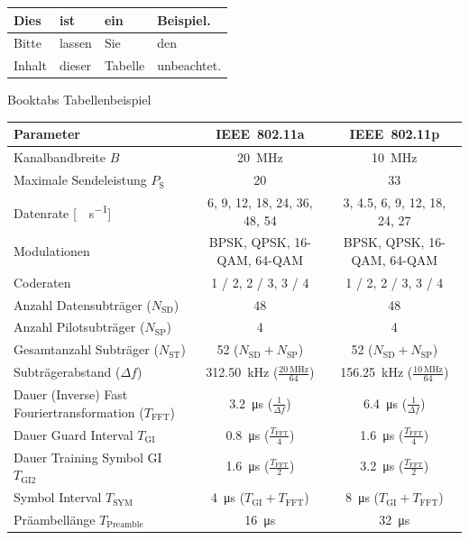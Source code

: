 \begin{table}[htb]
\centering
{}
\label{tbl:beispiel}
\begin{tabular}{l|lll}
Dies & ist & ein & Beispiel.\\\hline
Bitte & lassen & Sie & den \\
Inhalt & dieser & Tabelle & unbeachtet.
\end{tabular}
\end{table}

Booktabs Tabellenbeispiel

\begin{table}[htb]
	\label{tbl:params}
	\footnotesize
	\centering
	\begin{tabular}{m{5cm}*{2}{c}}	%
	\toprule
	\textbf{Parameter} & \textbf{IEEE~802.11a} & \textbf{IEEE~802.11p} \\
	\midrule
	Kanalbandbreite $B$ & \SI{20}{\mega\hertz} & \SI{10}{\mega\hertz} \\
	Maximale Sendeleistung $P_\text{S}$ & \SI{20}{\dBm} & \SI{33}{\dBm} \\
	Datenrate [\si{\mega\bit\per\second}] & 6, 9, 12, 18, 24, 36, 48, 54 & 3, 4.5, 6, 9, 12, 18, 24, 27 \\
	Modulationen & BPSK, QPSK, 16-QAM, 64-QAM & BPSK, QPSK, 16-QAM, 64-QAM \\
	Coderaten & \num{1 / 2}, \num{2 / 3}, \num{3 / 4} & \num{1 / 2}, \num{2 / 3}, \num{3 / 4} \\
	Anzahl Datensubträger ($N_{\text{SD}}$) & 48 & 48 \\
	Anzahl Pilotsubträger ($N_{\text{SP}}$) & 4 & 4 \\
	Gesamtanzahl Subträger ($N_{\text{ST}}$) & 52 ($N_{\text{SD}} + N_{\text{SP}}$) & 52 ($N_{\text{SD}} + N_{\text{SP}}$) \\
	Subträgerabstand ($\Delta f$) & \SI{312.50}{\kilo\hertz} ($\frac{\SI{20}{\mega\hertz}}{\num{64}}$) & \SI{156.25}{\kilo\hertz} ($\frac{\SI{10}{\mega\hertz}}{\num{64}}$) \\
	Dauer (Inverse) Fast Fourier\-trans\-for\-ma\-tion ($T_{\text{FFT}}$) & \SI{3.2}{\micro\s} ($\frac{1}{\Delta f}$) & \SI{6.4}{\micro\s} ($\frac{1}{\Delta f}$)\\
	Dauer Guard Interval $T_{\text{GI}}$ & \SI{0.8}{\micro\s} ($\frac{T_{\text{FFT}}}{4}$) & \SI{1.6}{\micro\s} ($\frac{T_{\text{FFT}}}{4}$) \\
	Dauer Training Symbol GI $T_{\text{GI2}}$ & \SI{1.6}{\micro\s} ($\frac{T_{\text{FFT}}}{2}$) & \SI{3.2}{\micro\s} ($\frac{T_{\text{FFT}}}{2}$) \\
	Symbol Interval $T_{\text{SYM}}$ & \SI{4}{\micro\s} ($T_{\text{GI}} + T_{\text{FFT}}$) & \SI{8}{\micro\s} ($T_{\text{GI}} + T_{\text{FFT}}$) \\
	Präambellänge $T_{\text{Preamble}}$ & \SI{16}{\micro\s} & \SI{32}{\micro\s} \\
	\bottomrule
	\end{tabular}
\end{table}

